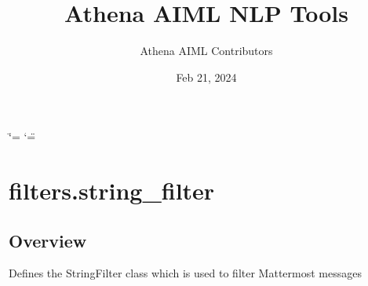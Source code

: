 \documentclass[letterpaper,10pt,english]{sphinxmanual}
\title{Athena AIML NLP Tools}
\date{Feb 21, 2024}
\author{Athena AIML Contributors}
\begin{document}
\ifdefined\shorthandoff
  \ifnum\catcode`\=\string=\active\shorthandoff{=}\fi
  \ifnum\catcode`\"=\active{}\fi
\fi

\pagestyle{empty}
\sphinxmaketitle
\pagestyle{plain}
\sphinxtableofcontents
\pagestyle{normal}
\label{\detokenize{index::doc}}


\sphinxstepscope


\chapter{filters.string\_filter}
\label{\detokenize{filters:filters-string-filter}}\label{\detokenize{filters::doc}}

\section{Overview}
\label{\detokenize{filters:module-filters.string_filter}}\label{\detokenize{filters:overview}}
\sphinxAtStartPar
Defines the StringFilter class which is used to filter Mattermost messages
\end{document}
